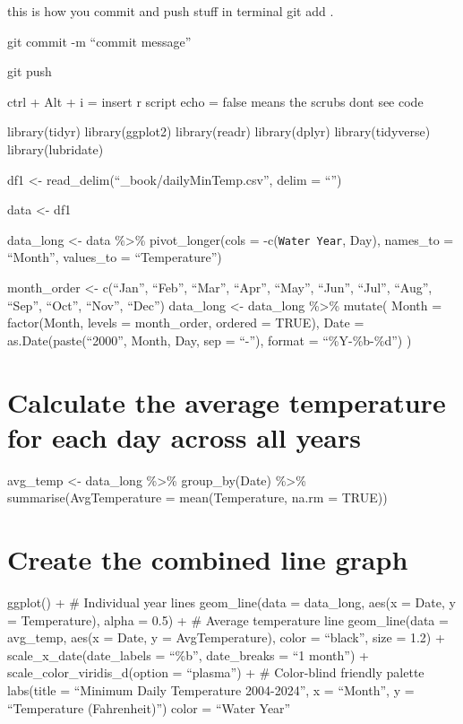 \documentclass[
]{book}
\theoremstyle{definition}
\theoremstyle{definition}
\theoremstyle{definition}
\theoremstyle{definition}
\theoremstyle{remark}
\begin{document}
this is how you commit and push stuff in terminal
git add .

git commit -m ``commit message''

git push

ctrl + Alt + i = insert r script
echo = false means the scrubs dont see code

library(tidyr)
library(ggplot2)
library(readr)
library(dplyr)
library(tidyverse)
library(lubridate)

df1 \textless- read\_delim(``\_book/dailyMinTemp.csv'', delim = ``\textbar{}'')

data \textless- df1

data\_long \textless- data \%\textgreater\%
pivot\_longer(cols = -c(\texttt{Water\ Year}, Day),
names\_to = ``Month'',
values\_to = ``Temperature'')

month\_order \textless- c(``Jan'', ``Feb'', ``Mar'', ``Apr'', ``May'', ``Jun'', ``Jul'', ``Aug'', ``Sep'', ``Oct'', ``Nov'', ``Dec'')
data\_long \textless- data\_long \%\textgreater\%
mutate(
Month = factor(Month, levels = month\_order, ordered = TRUE),
Date = as.Date(paste(``2000'', Month, Day, sep = ``-''), format = ``\%Y-\%b-\%d'')
)

\hypertarget{calculate-the-average-temperature-for-each-day-across-all-years}{%
\chapter{Calculate the average temperature for each day across all years}\label{calculate-the-average-temperature-for-each-day-across-all-years}}

avg\_temp \textless- data\_long \%\textgreater\%
group\_by(Date) \%\textgreater\%
summarise(AvgTemperature = mean(Temperature, na.rm = TRUE))

\hypertarget{create-the-combined-line-graph}{%
\chapter{Create the combined line graph}\label{create-the-combined-line-graph}}

ggplot() +
\# Individual year lines
geom\_line(data = data\_long,
aes(x = Date, y = Temperature),
alpha = 0.5) +
\# Average temperature line
geom\_line(data = avg\_temp,
aes(x = Date, y = AvgTemperature),
color = ``black'', size = 1.2) +
scale\_x\_date(date\_labels = ``\%b'', date\_breaks = ``1 month'') +
scale\_color\_viridis\_d(option = ``plasma'') + \# Color-blind friendly palette
labs(title = ``Minimum Daily Temperature 2004-2024'',
x = ``Month'',
y = ``Temperature (Fahrenheit)'')
color = ``Water Year''
\end{document}

